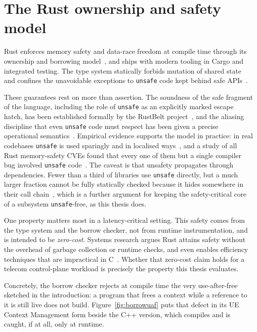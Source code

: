 \documentclass[english,twoside,openright,a4paper,censored,csm,software-track-2020]{HYthesisML}
\begin{document}
\section{The Rust ownership and safety model}
Rust enforces memory safety and data-race freedom at compile time through its ownership and
borrowing model~\cite{klabnik2023rust}, and ships with modern tooling in Cargo and integrated
testing. The type system statically forbids mutation of shared state and confines the
unavoidable exceptions to \texttt{unsafe} code kept behind safe APIs~\cite{jung2021safe}.

These guarantees rest on more than assertion. The soundness of the safe fragment of the
language, including the role of \texttt{unsafe} as an explicitly marked escape hatch, has
been established formally by the RustBelt project~\cite{jung2018rustbelt}, and the aliasing
discipline that even \texttt{unsafe} code must respect has been given a precise operational
semantics~\cite{jung2020stacked}. Empirical evidence supports the model in practice: in real
codebases \texttt{unsafe} is used sparingly and in localised
ways~\cite{qin2020rust,astrauskas2020unsafe}, and a study of all Rust memory-safety CVEs found
that every one of them but a single compiler bug involved \texttt{unsafe}
code~\cite{xu2021rustcve}. The caveat is that unsafety propagates through dependencies. Fewer
than a third of libraries use \texttt{unsafe} directly, but a much larger fraction cannot be
fully statically checked because it hides somewhere in their call
chain~\cite{evans2020rust}, which is a further argument for keeping the safety-critical core of a
subsystem \texttt{unsafe}-free, as this thesis does.

One property matters most in a latency-critical setting. This safety comes from the type system
and the borrow checker, not from runtime instrumentation, and is intended to be
\emph{zero-cost}. Systems research argues Rust attains safety without the overhead of garbage
collection or runtime checks, and even enables efficiency techniques that are impractical in
C~\cite{balasubramanian2017rust}. Whether that zero-cost claim holds for a telecom
control-plane workload is precisely the property this thesis evaluates.

Concretely, the borrow checker rejects at compile time the very use-after-free sketched in the
introduction: a program that frees a context while a reference to it is still live does not
build. Figure~\ref{fig:borrowuaf} puts that defect in its UE Context Management form beside the
C++ version, which compiles and is caught, if at all, only at runtime.
\end{document}
